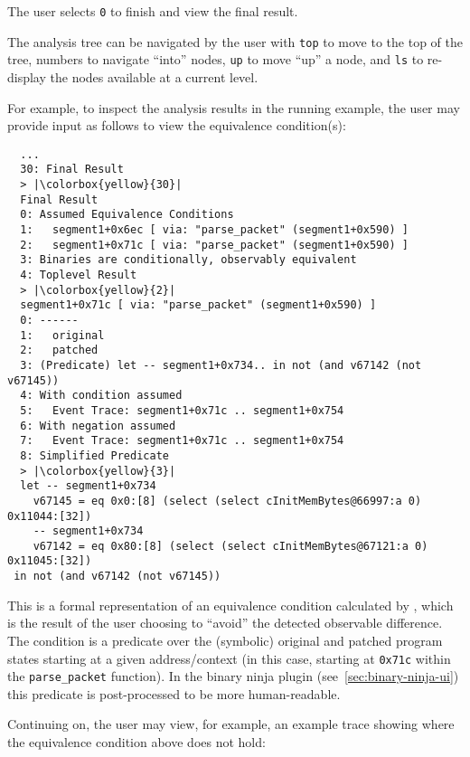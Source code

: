 The user selects \texttt{0} to finish and view the final result.

The \pate{} analysis tree can be navigated by the user with \texttt{top} to move to the top of the tree, numbers to navigate ``into'' nodes, \texttt{up} to move ``up'' a node, and \texttt{ls} to re-display the nodes available at a current level.

For example, to inspect the analysis results in the running example, the user may provide input as follows to view the equivalence condition(s):

\begin{lstlisting}
  ...
  30: Final Result
  > |\colorbox{yellow}{30}|
  Final Result
  0: Assumed Equivalence Conditions
  1:   segment1+0x6ec [ via: "parse_packet" (segment1+0x590) ]
  2:   segment1+0x71c [ via: "parse_packet" (segment1+0x590) ]
  3: Binaries are conditionally, observably equivalent
  4: Toplevel Result
  > |\colorbox{yellow}{2}|
  segment1+0x71c [ via: "parse_packet" (segment1+0x590) ]
  0: ------
  1:   original
  2:   patched
  3: (Predicate) let -- segment1+0x734.. in not (and v67142 (not v67145))
  4: With condition assumed
  5:   Event Trace: segment1+0x71c .. segment1+0x754
  6: With negation assumed
  7:   Event Trace: segment1+0x71c .. segment1+0x754
  8: Simplified Predicate
  > |\colorbox{yellow}{3}|
  let -- segment1+0x734
    v67145 = eq 0x0:[8] (select (select cInitMemBytes@66997:a 0) 0x11044:[32])
    -- segment1+0x734
    v67142 = eq 0x80:[8] (select (select cInitMemBytes@67121:a 0) 0x11045:[32])
 in not (and v67142 (not v67145))
\end{lstlisting}

This is a formal representation of an equivalence condition calculated by \pate{}, which is the result of the user
choosing to ``avoid'' the detected observable difference. The condition is a predicate over the (symbolic) original and patched program
states starting at a given address/context (in this case, starting at \texttt{0x71c} within the \texttt{parse\_packet} function).
In the binary ninja plugin (see~\ref{sec:binary-ninja-ui}) this predicate is post-processed to be more human-readable.

Continuing on, the user may view, for example, an example trace showing where the equivalence condition above does not hold:

